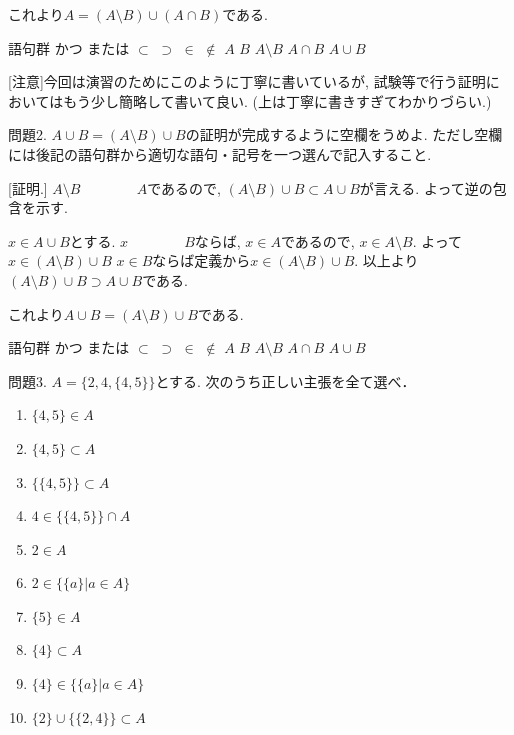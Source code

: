 \documentclass[dvipdfmx,a4paper,11pt]{article}
\theoremstyle{definition}
\begin{document}
これより$A  = (A \setminus B) \cup (A \cap B)$である. 

\begin{itembox}[l]{語句群}
かつ \quad または \quad $\subset$ \quad $\supset$
\quad $\in$ \quad $\not\in$ \quad $A$ \quad $B$ \quad $A \setminus B$ \quad $A \cap B$ \quad $A \cup B$
\end{itembox}

[注意]今回は演習のためにこのように丁寧に書いているが, 試験等で行う証明においてはもう少し簡略して書いて良い. (上は丁寧に書きすぎてわかりづらい.)
\newpage


\medskip 
問題2.  $A \cup B  = (A \setminus B) \cup B$の証明が完成するように空欄をうめよ. ただし空欄には後記の語句群から適切な語句・記号を一つ選んで記入すること. 

[証明.]
$A \setminus B \boxed{\phantom{hogehoge}} A$であるので, $(A \setminus B) \cup B \subset A \cup B$が言える. 
よって逆の包含を示す.

$x \in A \cup B$とする.
$x \boxed{\phantom{hogehoge}} B$ならば, $x \in A$であるので, $x \in A \setminus B$. よって$x \in (A \setminus B) \cup B$
$x \in B$ならば定義から$x \in (A \setminus B) \cup B$.
以上より$(A \setminus B) \cup B \supset A \cup B$である.

これより$A \cup B  = (A \setminus B) \cup B$である. 

\begin{itembox}[l]{語句群}
かつ \quad または \quad $\subset$ \quad $\supset$
\quad $\in$ \quad $\not\in$ \quad $A$ \quad $B$ \quad $A \setminus B$ \quad $A \cap B$ \quad $A \cup B$
\end{itembox}



問題3.  $A = \{ 2, 4, \{ 4, 5\}\}$とする. 次のうち正しい主張を全て選べ．
\begin{enumerate}[label=(\arabic*).]
 \setlength{\parskip}{0cm}
  \setlength{\itemsep}{0pt}
  \item $\{ 4, 5\} \in A$
\item $\{ 4, 5\} \subset A$ 
\item $\{ \{4,5 \}\} \subset A$
\item $4 \in \{\{ 4, 5\}\} \cap A$
\item $2 \in A$
\item $2  \in \{ \{a\} | a \in A \}$
\item $\{ 5 \} \in A$
\item $\{ 4 \} \subset A$
\item $\{ 4 \} \in \{ \{a\} | a \in A \}$
\item $\{2\} \cup \{\{2,4\} \}\subset A$
  \end{enumerate}
    
\end{document}
